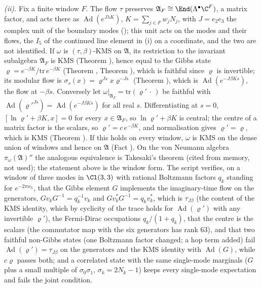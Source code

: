 \emph{(ii).} Fix a finite window $F$. The flow $\tau$ preserves $\mathfrak{A}_{F} \cong \End(\Lambda^{\bullet}\C^{F})$, a matrix factor, and acts there as $\operatorname{Ad}(e^{J\lambda K})$, $K = \sum_{j \in F}w_{j}N_{j}$, with $J = e_{2}e_{3}$ the complex unit of the boundary modes (); this unit acts on the modes and their flows, the $I_5$ of the continued line element in (i) on a coordinate, and the two are not identified. If $\omega$ is $(\tau, \beta)$-KMS on $\mathfrak{A}$, its restriction to the invariant subalgebra $\mathfrak{A}_{F}$ is KMS (Theorem ), hence equal to the Gibbs state $\varrho = e^{-\beta K}/\mathrm{tr}\,e^{-\beta K}$ (Theorem , Theorem ), which is faithful since $\varrho$ is invertible; its modular flow is $\sigma_{s}(x) = \varrho^{Js}x\varrho^{-Js}$ (Theorem ), which is $\operatorname{Ad}(e^{-J\beta Ks})$, the flow at $-\beta s$. Conversely let $\omega|_{\mathfrak{A}_{F}} = \mathrm{tr}(\varrho'\,\cdot\,)$ be faithful with $\operatorname{Ad}(\varrho'^{Js}) = \operatorname{Ad}(e^{-J\beta Ks})$ for all real $s$. Differentiating at $s = 0$, $[\ln\varrho' + \beta K, x] = 0$ for every $x \in \mathfrak{A}_{F}$, so $\ln\varrho' + \beta K$ is central; the centre of a matrix factor is the scalars, so $\varrho' = c\,e^{-\beta K}$, and normalisation gives $\varrho' = \varrho$, which is KMS (Theorem ). If this holds on every window, $\omega$ is KMS on the dense union of windows and hence on $\mathfrak{A}$ (Fact ). On the von Neumann algebra $\pi_{\omega}(\mathfrak{A})''$ the analogous equivalence is Takesaki's theorem (cited from memory, not used); the statement above is the window form. The script verifies, on a window of three modes in $\Cl(3,3)$ with rational Boltzmann factors $q_{k}$ standing for $e^{-2\pi w_{k}}$, that the Gibbs element $G$ implements the imaginary-time flow on the generators, $G v_{k} G^{-1} = q_{k}^{-1}v_{k}$ and $G v_{k}^{*}G^{-1} = q_{k}v_{k}^{*}$, which is $\tau_{J\beta}$ (the content of the KMS identity, which by cyclicity of the trace holds for $\operatorname{Ad}(\varrho')$ with any invertible $\varrho'$), the Fermi-Dirac occupations $q_{k}/(1 + q_{k})$, that the centre is the scalars (the commutator map with the six generators has rank $63$), and that two faithful non-Gibbs states (one Boltzmann factor changed; a hop term added) fail $\operatorname{Ad}(\varrho') = \tau_{J\beta}$ on the generators and the KMS identity with $\operatorname{Ad}(G)$, while $c\varrho$ passes both; and a correlated state with the same single-mode marginals ($G$ plus a small multiple of $\sigma_{0}\sigma_{1}$, $\sigma_{k} = 2N_{k} - 1$) keeps every single-mode expectation and fails the joint condition.

